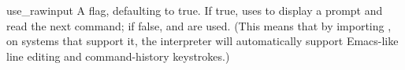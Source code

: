 \begin{memberdesc}{use_rawinput}
A flag, defaulting to true.  If true,  uses
 to display a prompt and read the next command;
if false,  and
 are used. (This means that by
importing , on systems that support it, the
interpreter will automatically support Emacs-like line editing 
and command-history keystrokes.)
\end{memberdesc}
